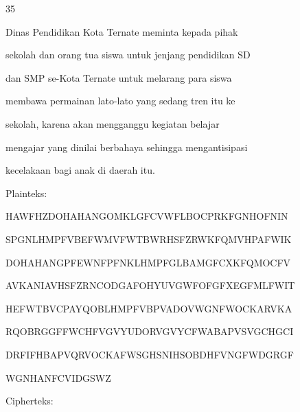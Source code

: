 \documentclass{article}
\begin{document}

35

Dinas Pendidikan Kota Ternate meminta kepada pihak 

sekolah dan orang tua siswa untuk jenjang pendidikan SD 

dan SMP se-Kota Ternate untuk melarang para siswa 

membawa permainan lato-lato yang sedang tren itu ke 

sekolah, karena akan mengganggu kegiatan belajar 

mengajar yang dinilai berbahaya sehingga mengantisipasi 

kecelakaan bagi anak di daerah itu.

Plainteks:

HAWFHZDOHAHANGOMKLGFCVWFLBOCPRKFGNHOFNIN

SPGNLHMPFVBEFWMVFWTBWRHSFZRWKFQMVHPAFWIK

DOHAHANGPFEWNFPFNKLHMPFGLBAMGFCXKFQMOCFV

AVKANIAVHSFZRNCODGAFOHYUVGWFOFGFXEGFMLFWIT

HEFWTBVCPAYQOBLHMPFVBPVADOVWGNFWOCKARVKA

RQOBRGGFFWCHFVGVYUDORVGVYCFWABAPVSVGCHGCI

DRFIFHBAPVQRVOCKAFWSGHSNIHSOBDHFVNGFWDGRGF

WGNHANFCVIDGSWZ

Cipherteks:
\end{document}
